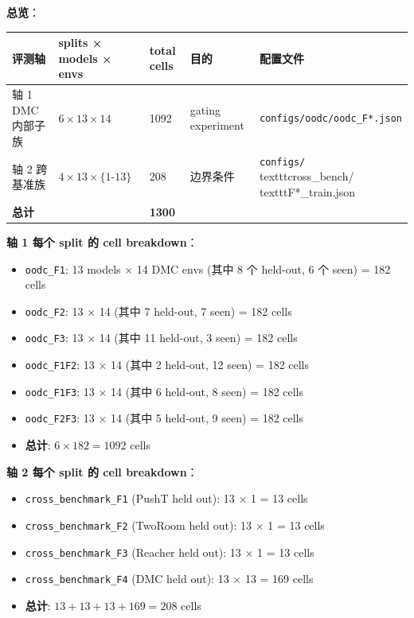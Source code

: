 \documentclass[11pt,a4paper]{article}
\begin{document}
\textbf{总览}：
\begingroup\scriptsize
\begin{adjustbox}{max width=\textwidth}
\begin{tabular}{@{}p{}p{}p{}p{}p{}@{}}
\textbf{评测轴} & \textbf{splits × models × envs} & \textbf{total cells} & \textbf{目的} & \textbf{配置文件} \\
\midrule
轴 1 DMC 内部子族 & $6 \times 13 \times 14$ & 1092 & gating experiment & \texttt{configs/oodc/oodc\_F*.json} \\
轴 2 跨基准族 & $4 \times 13 \times \{1\text{-}13\}$ & 208 & 边界条件 & \shortstack[l]{\texttt{configs/}\\texttt{cross\_bench/}\\texttt{F*\_train.json}} \\
\textbf{总计} & & \textbf{1300} & & \\
\bottomrule
\end{tabular}
\end{adjustbox}
\endgroup
\textbf{轴 1 每个 split 的 cell breakdown}：
\begin{itemize}[leftmargin=2em]
\item \texttt{oodc\_F1}: 13 models $\times$ 14 DMC envs (其中 8 个 held-out, 6 个 seen) = 182 cells
\item \texttt{oodc\_F2}: 13 $\times$ 14 (其中 7 held-out, 7 seen) = 182 cells
\item \texttt{oodc\_F3}: 13 $\times$ 14 (其中 11 held-out, 3 seen) = 182 cells
\item \texttt{oodc\_F1F2}: 13 $\times$ 14 (其中 2 held-out, 12 seen) = 182 cells
\item \texttt{oodc\_F1F3}: 13 $\times$ 14 (其中 6 held-out, 8 seen) = 182 cells
\item \texttt{oodc\_F2F3}: 13 $\times$ 14 (其中 5 held-out, 9 seen) = 182 cells
\item \textbf{总计}: $6 \times 182 = 1092$ cells
\end{itemize}

\textbf{轴 2 每个 split 的 cell breakdown}：
\begin{itemize}[leftmargin=2em]
\item \texttt{cross\_benchmark\_F1} (PushT held out): 13 $\times$ 1 = 13 cells
\item \texttt{cross\_benchmark\_F2} (TwoRoom held out): 13 $\times$ 1 = 13 cells
\item \texttt{cross\_benchmark\_F3} (Reacher held out): 13 $\times$ 1 = 13 cells
\item \texttt{cross\_benchmark\_F4} (DMC held out): 13 $\times$ 13 = 169 cells
\item \textbf{总计}: $13 + 13 + 13 + 169 = 208$ cells
\end{itemize}
\end{document}
